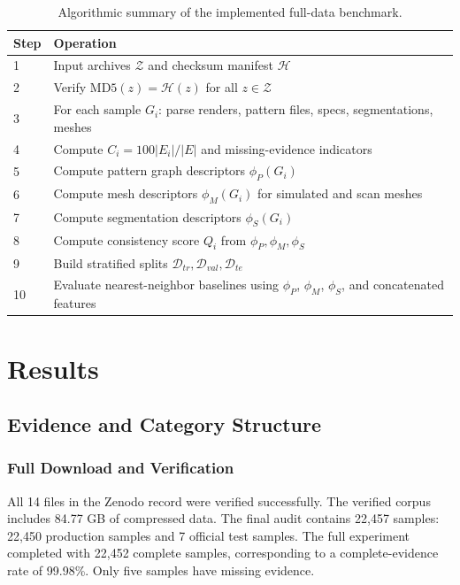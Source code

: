 \documentclass[pdflatex,sn-mathphys-num]{sn-jnl}
\begin{document}
\begin{table}[!htbp]
\caption{Algorithmic summary of the implemented full-data benchmark.}\label{tab:algorithm}
\centering
\begin{tabular}{ll}
\toprule
Step & Operation \\
\midrule
1 & Input archives $\mathcal{Z}$ and checksum manifest $\mathcal{H}$ \\
2 & Verify $\mathrm{MD5}(z)=\mathcal{H}(z)$ for all $z\in\mathcal{Z}$ \\
3 & For each sample $G_i$: parse renders, pattern files, specs, segmentations, meshes \\
4 & Compute $C_i=100|E_i|/|E|$ and missing-evidence indicators \\
5 & Compute pattern graph descriptors $\phi_P(G_i)$ \\
6 & Compute mesh descriptors $\phi_M(G_i)$ for simulated and scan meshes \\
7 & Compute segmentation descriptors $\phi_S(G_i)$ \\
8 & Compute consistency score $Q_i$ from $\phi_P,\phi_M,\phi_S$ \\
9 & Build stratified splits $\mathcal{D}_{tr},\mathcal{D}_{val},\mathcal{D}_{te}$ \\
10 & Evaluate nearest-neighbor baselines using $\phi_P$, $\phi_M$, $\phi_S$, and concatenated features \\
\bottomrule
\end{tabular}
\end{table}

\section{Results}\label{sec:results}

\subsection{Evidence and Category Structure}

\subsubsection{Full Download and Verification}

All 14 files in the Zenodo record were verified successfully. The verified corpus includes 84.77 GB of compressed data. The final audit contains 22,457 samples: 22,450 production samples and 7 official test samples. The full experiment completed with 22,452 complete samples, corresponding to a complete-evidence rate of 99.98\%. Only five samples have missing evidence.
\end{document}
